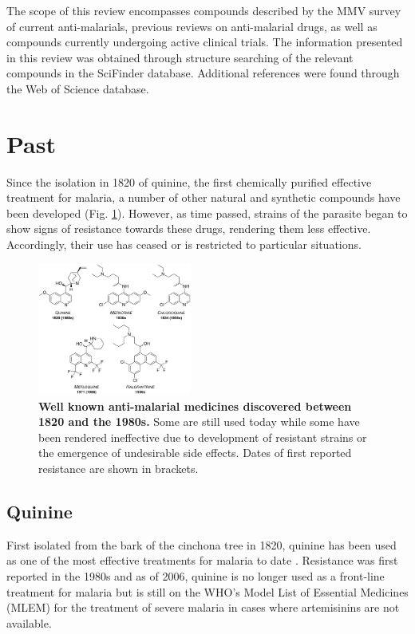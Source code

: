 \documentclass[twocolumn]{bmcart}%
\begin{document}
The scope of this review encompasses compounds described by the MMV survey of current anti-malarials, previous reviews on anti-malarial drugs, as well as compounds currently undergoing active clinical trials. The information presented in this review was obtained through structure searching of the relevant compounds in the SciFinder database. Additional references were found through the Web of Science database.

\section*{Past}
Since the isolation in 1820 of quinine, the first chemically purified effective treatment for malaria, a number of other natural and synthetic compounds have been developed (Fig. \ref{Figure1}). However, as time passed, strains of the parasite began to show signs of resistance towards these drugs, rendering them less effective. Accordingly, their use has ceased or is restricted to particular situations.
\begin{figure}[h]
	\includegraphics [width=0.45\textwidth] {Figure1} 
	\caption{{\bf Well known anti-malarial medicines discovered between 1820 and the 1980s.} Some are still used today while some have been rendered ineffective due to development of resistant strains or the emergence of undesirable side effects. Dates of first reported resistance are shown in brackets.}
	\label{Figure1}
\end{figure}

\subsection*{Quinine}
First isolated from the bark of the cinchona tree in 1820, quinine has been used as one of the most effective treatments for malaria to date \cite{Achan2011}. Resistance was first reported in the 1980s \cite{Bunnag1996} and as of 2006, quinine is no longer used as a front-line treatment for malaria but is still on the WHO's Model List of Essential Medicines (MLEM) \cite{MLEM} for the treatment of severe malaria in cases where artemisinins are not available.
\end{document}
